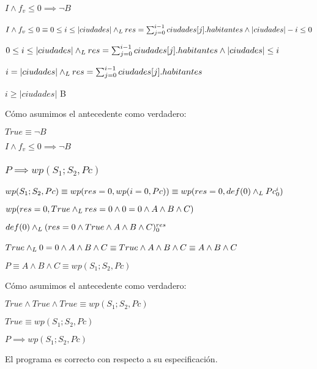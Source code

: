 \documentclass[10pt,a4paper]{article}
\begin{document}
\paragraph{$I \wedge f_{v} \leq 0 \implies \neg B$}
$I \wedge f_{v} \leq 0 \equiv 0 \leq i \leq |ciudades| \land _L res = \sum_{j=0}^{i-1} ciudades[j].habitantes \wedge |ciudades| - i \leq 0$ \equiv \par
\begin{center}
    $0 \leq i \leq |ciudades| \land _L res = \sum_{j=0}^{i-1} ciudades[j].habitantes \wedge |ciudades| \leq i$ \equiv \par
    \vspace{5px}
    $i = |ciudades| \land _L res = \sum_{j=0}^{i-1} ciudades[j].habitantes $ \implies \par
    \vspace{5px}
    $i \geq |ciudades|$ \equiv \neg B \par
    \vspace{5px}
\end{center}
\par Cómo asumimos el antecedente como verdadero:
\vspace{5px}
\begin{center}
    $True \equiv \neg B$ \par
    \vspace{5px}
    $I \wedge f_{v} \leq 0 \implies \neg B$
\end{center}

\subsubsection{$P \implies wp(S_{1};S_{2}, Pc)$}
$wp(S_{1};S_{2}, Pc) \equiv wp(res = 0, wp(i = 0, Pc)) \equiv wp(res = 0, def(0) \land _L Pc_{0}^{i})$ \equiv \par
\vspace{5px}
$wp(res = 0, True \land _L res = 0 \wedge 0 = 0 \wedge A \wedge B \wedge C) $ \equiv \par
\vspace{5px}
$def(0) \land _L (res = 0 \wedge True \wedge A \wedge B \wedge C)_{0}^{res} $ \equiv \par
\vspace{5px}
$True \land _L 0 = 0 \wedge A \wedge B \wedge C \equiv True \wedge A \wedge B \wedge C \equiv  A \wedge B \wedge C $ \ \par
\vspace{20px}
$P \equiv A \wedge B \wedge C \equiv  wp(S_{1};S_{2}, Pc)$
\vspace{5px}
\par Cómo asumimos el antecedente como verdadero:
\vspace{5px}
\begin{center}
$True \wedge True \wedge True \equiv wp(S_{1};S_{2}, Pc)$ \par
\vspace{5px}
$True \equiv wp(S_{1};S_{2}, Pc)$ \par
\vspace{5px}
    $P \implies wp(S_{1};S_{2}, Pc)$
\end{center}
\par El programa es correcto con respecto a su especificación.
\end{document}
